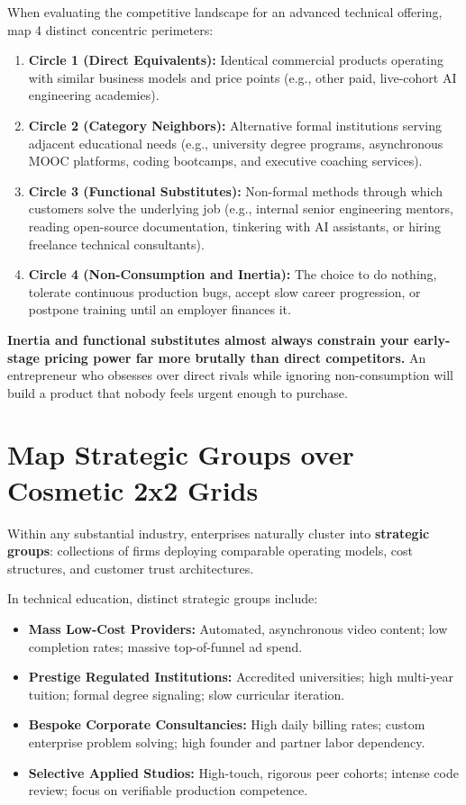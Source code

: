 When evaluating the competitive landscape for an advanced technical offering, map 4 distinct concentric perimeters:

\begin{enumerate}[leftmargin=14pt,itemsep=2pt,topsep=1pt,parsep=0pt]
  \item \textbf{Circle 1 (Direct Equivalents):} Identical commercial products operating with similar business models and price points (e.g., other paid, live-cohort AI engineering academies).
  \item \textbf{Circle 2 (Category Neighbors):} Alternative formal institutions serving adjacent educational needs (e.g., university degree programs, asynchronous MOOC platforms, coding bootcamps, and executive coaching services).
  \item \textbf{Circle 3 (Functional Substitutes):} Non-formal methods through which customers solve the underlying job (e.g., internal senior engineering mentors, reading open-source documentation, tinkering with AI assistants, or hiring freelance technical consultants).
  \item \textbf{Circle 4 (Non-Consumption and Inertia):} The choice to do nothing, tolerate continuous production bugs, accept slow career progression, or postpone training until an employer finances it.
\end{enumerate}

\textbf{Inertia and functional substitutes almost always constrain your early-stage pricing power far more brutally than direct competitors.} An entrepreneur who obsesses over direct rivals while ignoring non-consumption will build a product that nobody feels urgent enough to purchase.

\section{Map Strategic Groups over Cosmetic 2x2 Grids}

Within any substantial industry, enterprises naturally cluster into \textbf{strategic groups}: collections of firms deploying comparable operating models, cost structures, and customer trust architectures.

In technical education, distinct strategic groups include:
\begin{itemize}[leftmargin=12pt,itemsep=1pt,topsep=1pt]
  \item \textbf{Mass Low-Cost Providers:} Automated, asynchronous video content; low completion rates; massive top-of-funnel ad spend.
  \item \textbf{Prestige Regulated Institutions:} Accredited universities; high multi-year tuition; formal degree signaling; slow curricular iteration.
  \item \textbf{Bespoke Corporate Consultancies:} High daily billing rates; custom enterprise problem solving; high founder and partner labor dependency.
  \item \textbf{Selective Applied Studios:} High-touch, rigorous peer cohorts; intense code review; focus on verifiable production competence.
\end{itemize}

